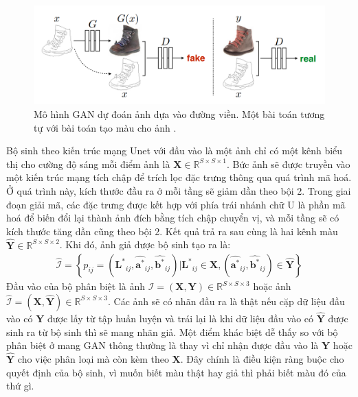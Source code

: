 \documentclass[a4paper, 12pt]{article}
\begin{document}
\begin{figure}[!h]
\captionsetup{width=0.8\textwidth}
\centering
\includegraphics[width=14cm]{images/2_9.PNG}
\caption{Mô hình GAN dự đoán ảnh dựa vào đường viền. Một bài toán tương tự với bài toán tạo màu cho ảnh \cite{isola2018imagetoimage}.}
\end{figure}

\noindent
Bộ sinh theo kiến trúc mạng Unet với đầu vào là một ảnh chỉ có một kênh biểu thị cho cường độ sáng mỗi điểm ảnh là $\mathbf{X} \in \mathbb{R}^{S\times S \times 1}$. Bức ảnh sẽ được truyền vào một kiến trúc mạng tích chập để trích lọc đặc trưng thông qua quá trình mã hoá. Ở quá trình này, kích thước đầu ra ở mỗi tầng sẽ giảm dần theo bội 2. Trong giai đoạn giải mã, các đặc trưng được kết hợp với phía trái nhánh chữ U là phần mã hoá để biến đổi lại thành ảnh đích bằng tích chập chuyển vị, và mỗi tầng sẽ có kích thước tăng dần cũng theo bội 2. Kết quả trả ra sau cùng là hai kênh màu $\mathbf{\widehat{Y}} \in \mathbb{R}^{S\times S \times 2}$. Khi đó, ảnh giả được bộ sinh tạo ra là:
\begin{align*}
    \widehat{\mathcal{I}} = \left\{p_{ij} = \left(\mathbf{L^*}_{ij}, \widehat{\mathbf{a^*}}_{ij}, \widehat{\mathbf{b^*}}_{ij}\right) \vert \mathbf{L^*}_{ij} \in \mathbf{X}, \left(\widehat{\mathbf{a^*}}_{ij}, \widehat{\mathbf{b^*}}_{ij}\right) \in \mathbf{\widehat{Y}}\right\}
\end{align*}
\noindent
Đầu vào của bộ phân biệt là ảnh $\mathcal{I} = \left(\mathbf{X}, \mathbf{Y}\right) \in \mathbb{R}^{S \times S \times 3}$ hoặc ảnh $\widehat{\mathcal{I}} = \left(\mathbf{X}, \mathbf{\widehat{Y}}\right) \in \mathbb{R}^{S \times S \times 3}$. Các ảnh sẽ có nhãn đầu ra là thật nếu cặp dữ liệu đầu vào có $\mathbf{Y}$ được lấy từ tập huấn luyện và trái lại là khi dữ liệu đầu vào có $\mathbf{\widehat{Y}}$ được sinh ra từ bộ sinh thì sẽ mang nhãn giả. Một điểm khác biệt dễ thấy so với bộ phân biệt ở mang GAN thông thường là thay vì chỉ nhận được đầu vào là $\mathbf{Y}$ hoặc $\mathbf{\widehat{Y}}$ cho việc phân loại mà còn kèm theo $\mathbf{X}$. Đây chính là điều kiện ràng buộc cho quyết định của bộ sinh, vì muốn biết màu thật hay giả thì phải biết màu đó của thứ gì.\vspace{5pt}\\
\end{document}
